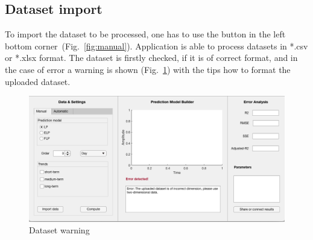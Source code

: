 

        \subsection{Dataset import}
 
       To import the dataset to be processed, one has to use the button in the left
        bottom corner~(Fig.~\ref{fig:manual}). Application is able to
        process datasets in *.csv or *.xlsx format. The dataset is firstly checked, if it is of correct format, and in the case of error a warning is shown (Fig.~\ref{fig:warning}) with the tips
        how to format the uploaded dataset.
               \begin{figure}[h!]
        \centering
            \includegraphics[width=\textwidth]{figures/warning.png}
            \caption{Dataset warning}
            \label{fig:warning}
    \end{figure}

